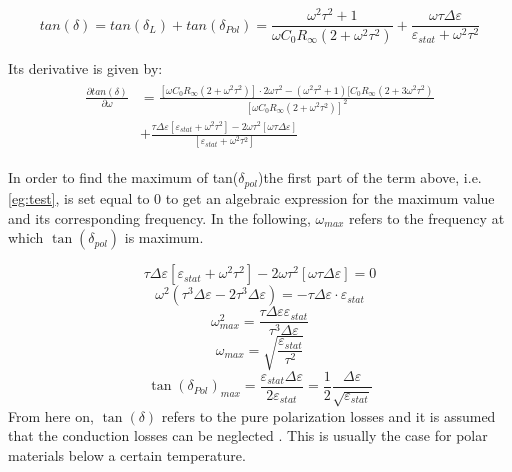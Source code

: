 \begin{equation}
tan(\delta) = tan(\delta_L) + tan( \delta_{Pol}) = \frac{\omega^2 \tau^2+1}{\omega C_0 R_\infty (2+ \omega^2 \tau^2)}+\frac{\omega \tau \Delta \varepsilon}{\varepsilon_{stat} + \omega^2 \tau^2}
\end{equation}

Its derivative is given by: 
\begin{align}
\begin{split}
\frac{\partial tan(\delta)}{ \partial \omega} & = \frac{[\omega C_0 R_\infty (2+\omega^2 \tau^2)]\cdot 2 \omega \tau^2 - (\omega^2 \tau^2 +1) [C_0 R_\infty (2+3 \omega^2 \tau^2)  }{[\omega C_0 R_\infty (2+\omega^2 \tau^2)]^2}\\
					      & + \frac{\tau \Delta \varepsilon [\varepsilon_{stat} + \omega^2 \tau^2] - 2 \omega \tau^2 [\omega \tau \Delta \varepsilon]}{[\varepsilon_{stat} +\omega^2 \tau^2]}
\label{eg:test}
\end{split}
\end{align}
					      
In order to find the maximum of tan($\delta_{pol}$)the first part of the term above, i.e. \eqref{eg:test}, is set equal to 0 to get an algebraic expression for the maximum value and its corresponding frequency. In the following, $\omega_{max}$ refers to the frequency at which $\tan(\delta_{pol})$ is maximum.

\begin{equation}
\tau \Delta \varepsilon [\varepsilon_{stat} + \omega^2 \tau^2] -2\omega \tau^2 [\omega \tau \Delta \varepsilon] = 0
\end{equation}
\begin{equation}
\omega^2 (\tau^3 \Delta \varepsilon -2 \tau^3 \Delta \varepsilon) = - \tau \Delta \varepsilon \cdot \varepsilon_{stat}
\end{equation}
\begin{equation}
\omega_{max}^2 = \frac{\tau \Delta \varepsilon \varepsilon_{stat}}{\tau^3 \Delta \varepsilon}
\end{equation}
\begin{equation}
\omega_{max} = \sqrt{\frac{\varepsilon_{stat}}{\tau^2}}
\end{equation}
\begin{equation}
\tan(\delta_{Pol})_{max} = \frac{\varepsilon_{stat} \Delta\varepsilon}{2\varepsilon_{stat}} = \frac{1}{2} \frac{\Delta \varepsilon}{\sqrt{\varepsilon_{stat}}}
\end{equation}
From here on, $\tan(\delta)$ refers to the pure polarization losses and it is assumed that the conduction losses can be neglected . This is usually the case for polar materials below a certain temperature. 

